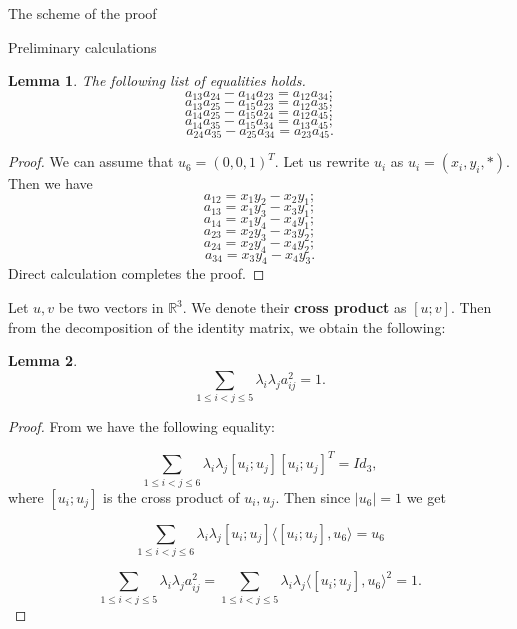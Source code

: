 \documentclass[12pt]{article}
\newtheorem{lemma}{Lemma}[section]
\begin{document}
\begin{section}{The scheme of the proof}
\begin{section}{Preliminary calculations}
\begin{lemma}
    The following list of equalities holds.
        $$
            a_{13}a_{24} - a_{14}a_{23} = a_{12}a_{34};
        $$
        $$
            a_{13}a_{25} - a_{15}a_{23} = a_{12}a_{35};
        $$
        $$
            a_{14}a_{25} - a_{15}a_{24} = a_{12}a_{45};
        $$
        $$
            a_{14}a_{35} - a_{15}a_{34} = a_{13}a_{45};
        $$
        $$
            a_{24}a_{35} - a_{25}a_{34} = a_{23}a_{45}.
        $$
    \end{lemma}

    \begin{proof}
       We can assume that $u_{6} = (0,0,1)^{T}$. Let us rewrite $u_{i}$ as $ u_{i} = (x_{i},y_{i},*).$
        Then we have
        $$
            a_{12} = x_{1}y_{2}-x_{2}y_{1}; 
        $$
        $$
            a_{13} = x_{1}y_{3}-x_{3}y_{1};
        $$
        $$
            a_{14} = x_{1}y_{4}-x_{4}y_{1};
        $$
        $$
            a_{23} = x_{2}y_{3}-x_{3}y_{2};
        $$
         $$
            a_{24} = x_{2}y_{4}-x_{4}y_{2};
        $$
        $$
            a_{34} = x_{3}y_{4}-x_{4}y_{3}.
        $$
        Direct calculation completes the proof.
    \end{proof}

        
    Let $u,v$ be two vectors  in $ \mathbb{R}^{3}$. We denote their \textbf{cross product} as $[u;v]$. 
     Then from the decomposition of the identity matrix, we obtain the following:

    \begin{lemma}
    \label{id-cor}
        $$
            \sum_{1\leq i<j\leq 5} \lambda_{i}\lambda_{j}a_{ij}^2= 1.
        $$
    \end{lemma}
    
    \begin{proof}
        From \cite{g-ivanov} we have the following equality:

        $$
            \sum_{1\leq i<j\leq 6}\lambda_{i}\lambda_{j}[u_{i}; u_{j}][u_{i}; u_{j}]^{T} = Id_{3},
        $$
        where $[u_{i}; u_{j}]$ is the cross product of $u_{i},u_{j}$.
        Then since $|u_{6}|=1$ we get

        $$
            \sum_{1\leq i<j\leq 6}\lambda_{i}\lambda_{j}[u_{i}; u_{j}]\langle[u_{i}; u_{j}], u_{6} \rangle = u_{6}
        $$

        $$
         \sum_{1\leq i<j\leq 5} \lambda_{i}\lambda_{j}a_{ij}^2 = \sum_{1\leq i<j\leq 5}\lambda_{i}\lambda_{j}\langle[u_{i}; u_{j}], u_{6} \rangle ^{2}= 1.
        $$
        
    \end{proof}
    

\end{section}
\end{section}
\end{document}
